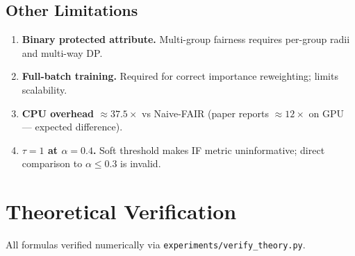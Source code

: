 \documentclass[11pt,a4paper]{article}
\begin{document}
\subsection{Other Limitations}

\begin{enumerate}
\item \textbf{Binary protected attribute.}
  Multi-group fairness requires per-group radii and multi-way DP.
\item \textbf{Full-batch training.}
  Required for correct importance reweighting; limits scalability.
\item \textbf{CPU overhead $\approx 37.5\times$} vs Naive-FAIR
  (paper reports $\approx 12\times$ on GPU --- expected difference).
\item \textbf{$\tau=1$ at $\alpha=0.4$.}
  Soft threshold makes IF metric uninformative; direct comparison to
  $\alpha\le 0.3$ is invalid.
\end{enumerate}

\section{Theoretical Verification}

All formulas verified numerically via \texttt{experiments/verify\_theory.py}.
\end{document}
